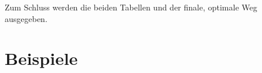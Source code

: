 \documentclass[a4paper,10pt,ngerman]{scrartcl}
\begin{document}
Zum Schluss werden die beiden Tabellen und der finale, optimale Weg ausgegeben.

\section{Beispiele}
\end{document}

